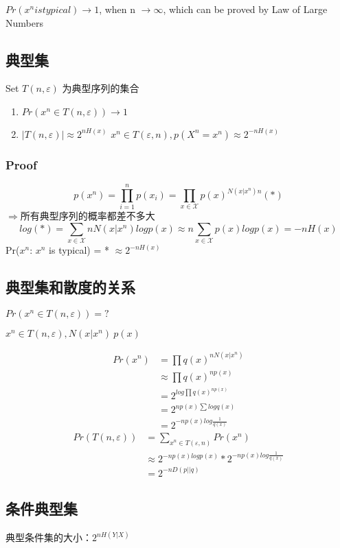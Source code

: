 \documentclass[a4paper, 12pt]{article}
\begin{document}
    $Pr(x^n is typical)\rightarrow 1$, when n $\rightarrow \infty$, which can be proved by Law of Large Numbers
    \subsection{典型集}
    Set $T(n, \varepsilon)$ 为典型序列的集合

    \begin{enumerate}
        \item $Pr(x^n \in T(n, \varepsilon))\rightarrow 1$
        \item $|T(n,\varepsilon)|\approx2^{nH(x)}$
         $x^n\in T(\varepsilon, n), p(X^n=x^n)\approx 2^{-nH(x)}$
    \end{enumerate}
    \subsubsection{Proof}
    \[
        p(x^n)=\prod_{i=1}^{n}p(x_i)=\prod_{x\in \mathcal{X}}p(x)^{N(x|x^n)n} (*)
    \]
    $\Rightarrow$所有典型序列的概率都差不多大
    \[
        log(*)=\sum_{x\in \mathcal{X}}nN(x|x^n)logp(x)\approx n\sum_{x\in \mathcal{X}}p(x)logp(x)=-nH(x)
    \]
    Pr($x^n$: $x^n$ is typical) = * $\approx 2^{-nH(x)}$

    \subsection{典型集和散度的关系}
    $Pr(x^n\in T(n, \varepsilon))=?$
    
    $x^n\in T(n, \varepsilon), N(x|x^n)~p(x)$

    \begin{equation}
        \begin{aligned}
            Pr(x^n)&=\prod q(x)^{nN(x|x^n)}\\
            &\approx \prod q(x)^{np(x)}\\
            &=2^{log\prod q(x)^{np(x)}}\\
            &=2^{np(x)\sum logq(x)}\\
            &=2^{-np(x)log\frac{1}{q(x)}}
        \end{aligned}
    \end{equation}
    \begin{equation}
        \begin{aligned}
            Pr(T(n, \varepsilon)) &= \sum_{x^n \in T(\varepsilon, n)}Pr(x^n)\\
            &\approx 2^{-np(x)log p(x)}*2^{-np(x)log \frac{1}{q(x)}}\\
            &=2^{-nD(p||q)}
        \end{aligned}
    \end{equation}
    \subsection{条件典型集}
    典型条件集的大小：$2^{nH(Y|X)}$    
\end{document}
